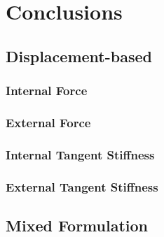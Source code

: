 \section{Conclusions}
\subsection{Displacement-based}
\subsubsection{Internal Force}
\subsubsection{External Force}
\subsubsection{Internal Tangent Stiffness}
\subsubsection{External Tangent Stiffness}
\subsection{Mixed Formulation}





